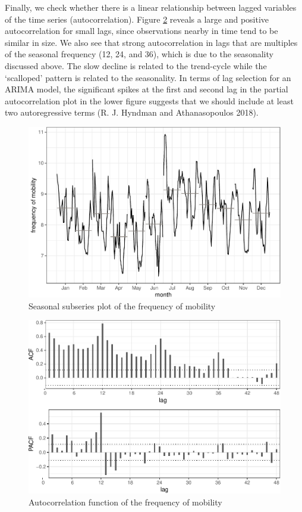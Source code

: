 \documentclass[]{article}
\begin{document}
Finally, we check whether there is a linear relationship between lagged
variables of the time series (autocorrelation). Figure
\ref{fig:autocorr-plot} reveals a large and positive autocorrelation for
small lags, since observations nearby in time tend to be similar in
size. We also see that strong autocorrelation in lags that are multiples
of the seasonal frequency (12, 24, and 36), which is due to the
seasonality discussed above. The slow decline is related to the
trend-cycle while the `scalloped' pattern is related to the seasonality.
In terms of lag selection for an ARIMA model, the significant spikes at
the first and second lag in the partial autocorrelation plot in the
lower figure suggests that we should include at least two autoregressive
terms (R. J. Hyndman and Athanasopoulos 2018).

\begin{figure}
\centering
\includegraphics{../figs/freq--freq-month-plot-1.pdf}
\caption{\label{fig:freq-month-plot}Seasonal subseries plot of the frequency
of mobility}
\end{figure}

\begin{figure}
\centering
\includegraphics{../figs/freq--autocorr-plot-1.pdf}
\caption{\label{fig:autocorr-plot}Autocorrelation function of the frequency
of mobility}
\end{figure}
\end{document}
